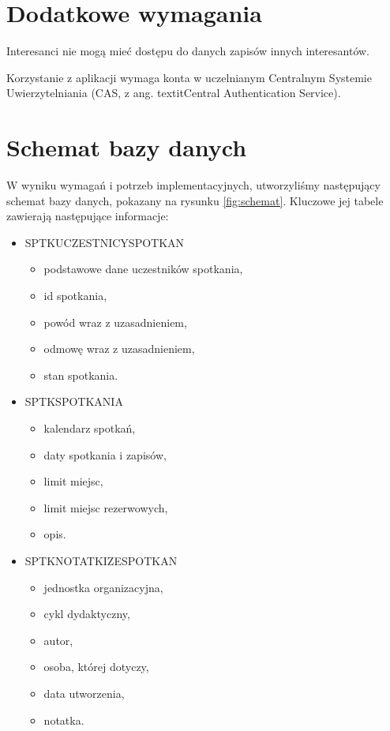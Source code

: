 \documentclass[licencjacka]{pracamgr}
\begin{document}
\section{Dodatkowe wymagania}
	\begin{step}
		\item Interesanci nie mogą mieć dostępu do danych zapisów innych interesantów.
		\item Korzystanie z aplikacji wymaga konta w uczelnianym Centralnym Systemie Uwierzytelniania (CAS, z ang. textit{Central Authentication Service}).
	\end{step}
	
\section{Schemat bazy danych}

W wyniku wymagań i potrzeb implementacyjnych, utworzyliśmy następujący schemat bazy danych, pokazany na rysunku \ref{fig:schemat}. Kluczowe jej tabele zawierają następujące informacje:

\begin{itemize}
\item SPTK\textunderscore UCZESTNICY\textunderscore SPOTKAN
	\begin{itemize}
	\item podstawowe dane uczestników spotkania,
	\item id spotkania,
	\item powód wraz z uzasadnieniem,
	\item odmowę wraz z uzasadnieniem,
	\item stan spotkania.
	\end{itemize}
\item SPTK\textunderscore SPOTKANIA
	\begin{itemize}
	\item kalendarz spotkań,
	\item daty spotkania i zapisów,
	\item limit miejsc,
	\item limit miejsc rezerwowych,
	\item opis.
	\end{itemize}
\item SPTK\textunderscore NOTATKI\textunderscore ZE\textunderscore SPOTKAN
	\begin{itemize}
	\item jednostka organizacyjna,
	\item cykl dydaktyczny,
	\item autor,
	\item osoba, której dotyczy,
	\item data utworzenia,
	\item notatka.
	\end{itemize}
\end{itemize}
\end{document}
